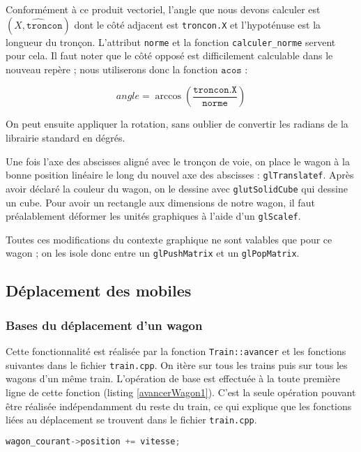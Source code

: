 \documentclass[a4paper, oneside, 11pt, twocolumn]{article}
\begin{document}
Conformément à ce produit vectoriel, l'angle que nous devons calculer est $(\widehat{X,\mathtt{troncon}})$ dont le côté adjacent est \texttt{troncon.X} et l'hypoténuse est la longueur du tronçon. L'attribut \texttt{norme} et la fonction \texttt{calculer\_norme} servent pour cela. Il faut noter que le côté opposé est difficilement calculable dans le nouveau repère ; nous utiliserons donc la fonction $\mathtt{acos}$ :

$$\mathit{angle} = \arccos\left(\frac{\mathtt{troncon.X}}{\mathtt{norme}}\right)$$

On peut ensuite appliquer la rotation, sans oublier de convertir les radians de la librairie standard en dégrés.

Une fois l'axe des abscisses aligné avec le tronçon de voie, on place le wagon à la bonne position linéaire le long du nouvel axe des abscisses : \texttt{glTranslatef}. Après avoir déclaré la couleur du wagon, on le dessine avec \texttt{glutSolidCube} qui dessine un cube. Pour avoir un rectangle aux dimensions de notre wagon, il faut préalablement déformer les unités graphiques à l'aide d'un \texttt{glScalef}.

Toutes ces modifications du contexte graphique ne sont valables que pour ce wagon ; on les isole donc entre un \texttt{glPushMatrix} et un \texttt{glPopMatrix}.

\subsection{Déplacement des mobiles}
\label{avancerWagon}

\subsubsection[Bases]{Bases du déplacement d'un wagon}

Cette fonctionnalité est réalisée par la fonction \texttt{Train::avancer} et les fonctions suivantes dans le fichier \texttt{train.cpp}. On itère sur tous les trains puis sur tous les wagons d'un même train. L'opération de base est effectuée à la toute première ligne de cette fonction (listing \no\ref{avancerWagon1}). C'est la seule opération pouvant être réalisée indépendamment du reste du train, ce qui explique que les fonctions liées au déplacement se trouvent dans le fichier \texttt{train.cpp}.

\noindent
\begin{lstlisting}[language=C++, float=h, caption={Avancer un wagon (base)}, label=avancerWagon1, basicstyle=\small]
wagon_courant->position += vitesse;
\end{lstlisting}
\end{document}
